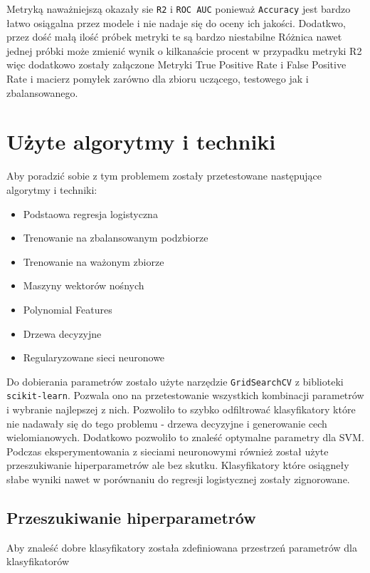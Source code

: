 \documentclass[12pt]{article}
\def\code#1{\texttt{#1}}
\begin{document}
        Metryką naważniejszą okazały sie \code{R2} i \code{ROC AUC} ponieważ \code{Accuracy} jest bardzo łatwo osiągalna przez 
        modele i nie nadaje się do oceny ich jakości. Dodatkwo, przez dość małą ilość próbek metryki te są bardzo niestabilne
        Różnica nawet jednej próbki może zmienić wynik o kilkanaście procent w przypadku metryki R2 więc dodatkowo zostały załączone 
        Metryki True Positive Rate i False Positive Rate i macierz pomyłek zarówno dla zbioru uczącego, testowego jak i zbalansowanego.

        \section{Użyte algorytmy i techniki}
        Aby poradzić sobie z tym problemem zostały przetestowane następujące algorytmy i techniki:

        \begin{itemize}
            \item Podstaowa regresja logistyczna
            \item Trenowanie na zbalansowanym podzbiorze
            \item Trenowanie na ważonym zbiorze
            \item Maszyny wektorów nośnych
            \item Polynomial Features
            \item Drzewa decyzyjne
            \item Regularyzowane sieci neuronowe
        \end{itemize}

        Do dobierania parametrów zostało użyte narzędzie \code{GridSearchCV} z biblioteki \code{scikit-learn}. Pozwala ono na 
        przetestowanie wszystkich kombinacji parametrów i wybranie najlepszej z nich. Pozwoliło to szybko odfiltrować klasyfikatory
        które nie nadawały się do tego problemu - drzewa decyzyjne i generowanie cech wielomianowych. Dodatkowo pozwoliło to znaleść
        optymalne parametry dla SVM. Podczas eksperymentowania z sieciami neuronowymi również został użyte przeszukiwanie hiperparametrów
        ale bez skutku. Klasyfikatory które osiągneły słabe wyniki nawet w porównaniu do regresji logistycznej zostały zignorowane.
        
        \subsection{Przeszukiwanie hiperparametrów}
        Aby znaleść dobre klasyfikatory została zdefiniowana przestrzeń parametrów dla klasyfikatorów
\end{document}
